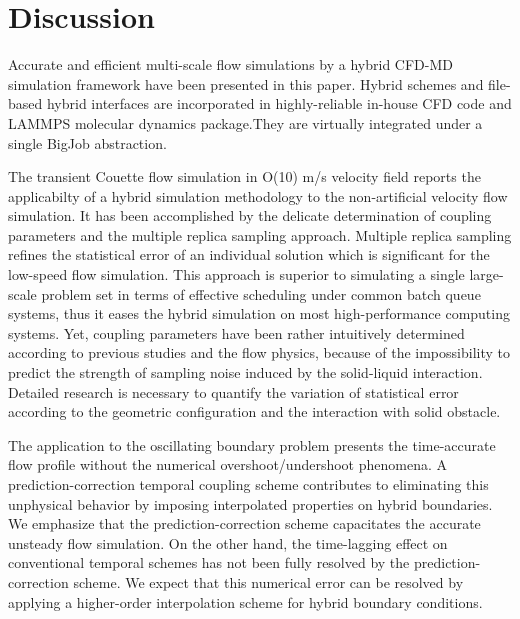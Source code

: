 \documentclass[preprint,12pt]{elsarticle}
\begin{document}
\section{Discussion}
\label{sec:conclusion}

Accurate and efficient multi-scale flow simulations by a hybrid CFD-MD simulation framework have been presented in this paper. Hybrid schemes and file-based hybrid interfaces are incorporated in highly-reliable in-house CFD code and LAMMPS molecular dynamics package.They are virtually integrated under a single BigJob abstraction.

The transient Couette flow simulation in O(10) m/s velocity field reports the applicabilty of a hybrid simulation methodology to the non-artificial velocity flow simulation. It has been accomplished by the delicate determination of coupling parameters and the multiple replica sampling approach. Multiple replica sampling refines the statistical error of an individual solution which is significant for the low-speed flow simulation. This approach is superior to simulating a single large-scale problem set in terms of effective scheduling under common batch queue systems, thus it eases the hybrid simulation on most high-performance computing systems. Yet, coupling parameters have been rather intuitively determined according to previous studies and the flow physics, because of the impossibility to predict the strength of sampling noise induced by the solid-liquid interaction. Detailed research is necessary to quantify the variation of statistical error according to the geometric configuration and the interaction with solid obstacle.

The application to the oscillating boundary problem presents the time-accurate flow profile without the numerical overshoot/undershoot phenomena. A prediction-correction temporal coupling scheme contributes to eliminating this unphysical behavior by imposing interpolated properties on hybrid boundaries. We emphasize that the prediction-correction scheme capacitates the accurate unsteady flow simulation. On the other hand, the time-lagging effect on conventional temporal schemes has not been fully resolved by the prediction-correction scheme. We expect that this numerical error can be resolved by applying a higher-order interpolation scheme for hybrid boundary conditions.
\end{document}
